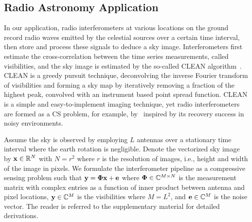 \documentclass{article}
\begin{document}
\vspace{-0.5em}
\subsection{Radio Astronomy Application}
\vspace{-0.5em}

In our application, radio interferometers at various locations on the ground record radio waves emitted by the celestial sources over a certain time interval, then store and process these signals to deduce a sky image. Interferometers first estimate the cross-correlation between the time series measurements, called visibilities, and the sky image is estimated by the so-called {CLEAN} algorithm~\cite{hogbom1974clean}. {CLEAN} is a greedy pursuit technique, deconvolving the inverse Fourier transform of visibilities and forming a sky map by iteratively removing a fraction of the highest peak, convolved with an instrument based point spread function. CLEAN is a simple and easy-to-implement imaging technique, yet radio interferometers are formed as a CS problem, for example, by~\cite{wiaux2009csforra, wenger2010csforra, li2011deconvolution} inspired by its recovery success in noisy environments.
\vspace{-.3em}

Assume the sky is observed by employing $L$ antennas over a stationary time interval where the earth rotation is negligible. Denote the vectorized sky image by ${\bf x} \in \mathbb{R}^N$ with $N = {r^2}$ where $r$ is the resolution of images, i.e., height and width of the image in pixels. We formulate the interferometer pipeline as a compressive sensing problem such that ${\bf y} = {\bf \Phi} {\bf x} + {\bf e}$ where ${\bf \Phi} \in \mathbb{C}^{M\times N}$ is the measurement matrix with complex entries as a function of inner product between antenna and pixel locations, ${\bf y} \in \mathbb{C}^{M}$ is the visibilities where $M=L^2$, and ${\bf e} \in \mathbb{C}^M$ is the noise vector. The reader is referred to the supplementary material for detailed derivations. 
\end{document}

